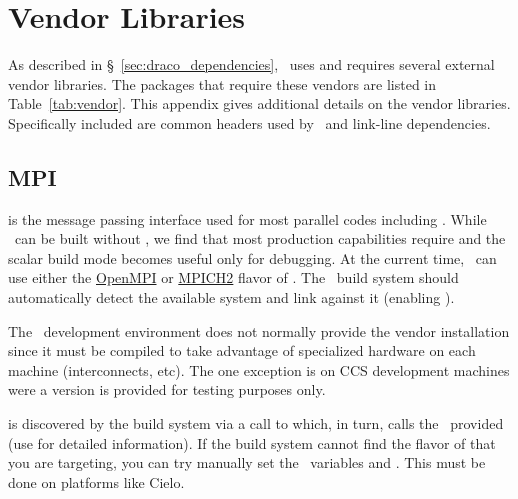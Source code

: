 
\chapter{Vendor Libraries}
\label{app:vendor_libs}

As described in \S~\ref{sec:draco_dependencies}, \draco\ uses and
requires several external vendor libraries.  The packages that require
these vendors are listed in Table~\ref{tab:vendor}.  This appendix
gives additional details on the vendor libraries.  Specifically
included are common headers used by \draco\ and link-line
dependencies.


\section{MPI}
\label{appsec:mpi}

 is the message passing interface used for most parallel codes including \draco.
While \draco\ can be built without , we find that most production capabilities require  and the scalar build mode becomes useful only for debugging.  At the current time, \draco\ can use either the \href{http://www.openmpi.org}{OpenMPI} or \href{http://www.mcs.anl.gov/research/projects/mpich2/}{MPICH2} flavor of . The \draco\ build system should automatically detect the available  system and link against it (enabling ).  

The \draco\ development environment does not normally provide the  vendor installation since it must be compiled to take advantage of specialized hardware on each machine (interconnects, etc).  The one exception is on CCS development machines were a version is provided for testing purposes only. 

 is discovered by the build system via a call to  which, in turn, calls the \cmake\ provided  (use  for detailed information).  If the build system cannot find the flavor of  that you are targeting, you can try manually set the \cmake\ variables  and .  This must be done on platforms like Cielo.

